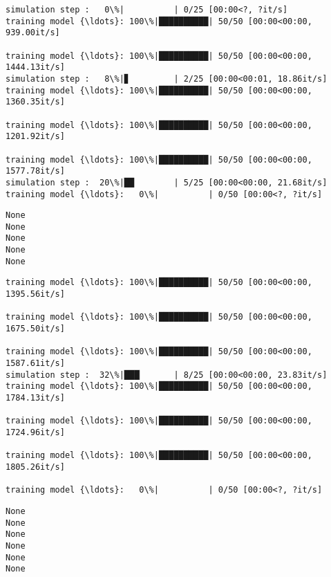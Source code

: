 \documentclass[11pt]{article}
\begin{document}
    \begin{Verbatim}[commandchars=\\\{\}]
simulation step :   0\%|          | 0/25 [00:00<?, ?it/s]
training model {\ldots}: 100\%|██████████| 50/50 [00:00<00:00, 939.00it/s]

training model {\ldots}: 100\%|██████████| 50/50 [00:00<00:00, 1444.13it/s]
simulation step :   8\%|▊         | 2/25 [00:00<00:01, 18.86it/s]
training model {\ldots}: 100\%|██████████| 50/50 [00:00<00:00, 1360.35it/s]

training model {\ldots}: 100\%|██████████| 50/50 [00:00<00:00, 1201.92it/s]

training model {\ldots}: 100\%|██████████| 50/50 [00:00<00:00, 1577.78it/s]
simulation step :  20\%|██        | 5/25 [00:00<00:00, 21.68it/s]
training model {\ldots}:   0\%|          | 0/50 [00:00<?, ?it/s]
    \end{Verbatim}

    \begin{Verbatim}[commandchars=\\\{\}]
None
None
None
None
None
    \end{Verbatim}

    \begin{Verbatim}[commandchars=\\\{\}]
training model {\ldots}: 100\%|██████████| 50/50 [00:00<00:00, 1395.56it/s]

training model {\ldots}: 100\%|██████████| 50/50 [00:00<00:00, 1675.50it/s]

training model {\ldots}: 100\%|██████████| 50/50 [00:00<00:00, 1587.61it/s]
simulation step :  32\%|███▏      | 8/25 [00:00<00:00, 23.83it/s]
training model {\ldots}: 100\%|██████████| 50/50 [00:00<00:00, 1784.13it/s]

training model {\ldots}: 100\%|██████████| 50/50 [00:00<00:00, 1724.96it/s]

training model {\ldots}: 100\%|██████████| 50/50 [00:00<00:00, 1805.26it/s]

training model {\ldots}:   0\%|          | 0/50 [00:00<?, ?it/s]
    \end{Verbatim}

    \begin{Verbatim}[commandchars=\\\{\}]
None
None
None
None
None
None
    \end{Verbatim}
\end{document}
